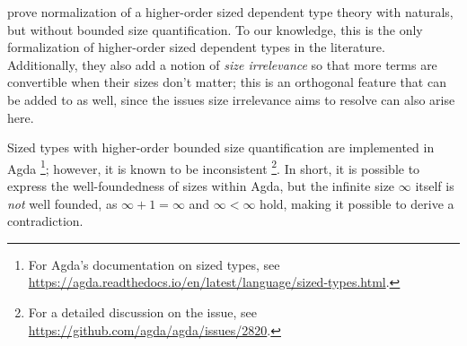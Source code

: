 \cite{nbe} prove normalization of a higher-order sized dependent type theory with naturals, but without bounded size quantification.
To our knowledge, this is the only formalization of higher-order sized dependent types in the literature.
Additionally, they also add a notion of \emph{size irrelevance} so that more terms are convertible when their sizes don't matter;
this is an orthogonal feature that can be added to \lang as well,
since the issues size irrelevance aims to resolve can also arise here.

Sized types with higher-order bounded size quantification are implemented in Agda%
\footnote{For Agda's documentation on sized types, see \url{https://agda.readthedocs.io/en/latest/language/sized-types.html}.};
however, it is known to be inconsistent%
\footnote{For a detailed discussion on the issue, see \url{https://github.com/agda/agda/issues/2820}.}.
In short, it is possible to express the well-foundedness of sizes within Agda,
but the infinite size $\infty$ itself is \emph{not} well founded,
as $\infty + 1 = \infty$ and $\infty < \infty$ hold,
making it possible to derive a contradiction.


